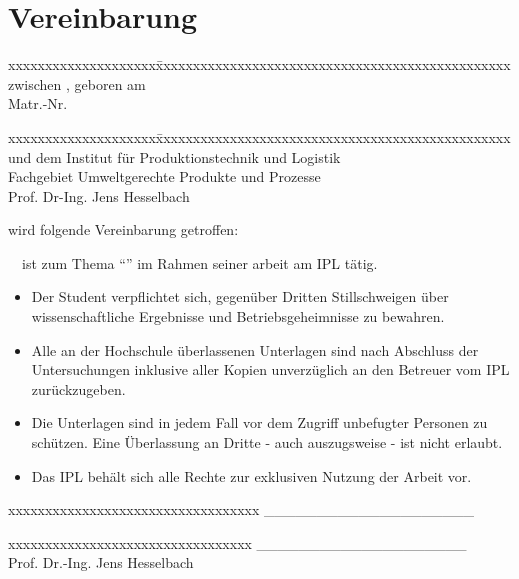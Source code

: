\vspace*{-3cm}
\thispagestyle{empty}
\thispagestyle{plain}								%

\section*{Vereinbarung}
\vskip 20pt
\begin{tabbing}
xxxxxxxxxxxxxxxxxxxx\=xxxxxxxxxxxxxxxxxxxxxxxxxxxxxxxxxxxxxxxxxxxxxxxx\kill
zwischen 			\> \vornamenachname, geboren am \geburtsdatum \\
							\>Matr.-Nr. \matrikelnummer \bigskip
\end{tabbing}
\begin{tabbing}
xxxxxxxxxxxxxxxxxxxx\=xxxxxxxxxxxxxxxxxxxxxxxxxxxxxxxxxxxxxxxxxxxxxxxx\kill
und dem \>Institut für Produktionstechnik und Logistik\\
\>Fachgebiet Umweltgerechte Produkte und Prozesse\\
\>Prof. Dr-Ing. Jens Hesselbach
\end{tabbing}
\vskip 20pt
wird folgende Vereinbarung getroffen: \\
\vskip 20pt


\anrede\ \vornamenachname\ ist zum Thema "`\thesistitle"' im Rahmen seiner \thesistype arbeit am IPL tätig.

\vskip 20pt
\begin{itemize}																	%
\item{Der Student verpflichtet sich, gegenüber Dritten Stillschweigen über wissenschaftliche Ergebnisse und Betriebsgeheimnisse zu bewahren.}
\item{Alle an der Hochschule überlassenen Unterlagen sind nach Abschluss der Untersuchungen inklusive aller Kopien unverzüglich an den Betreuer vom IPL zurückzugeben.}
\item{Die Unterlagen sind in jedem Fall vor dem Zugriff unbefugter Personen zu schützen. Eine Überlassung an Dritte - auch auszugsweise - ist nicht erlaubt.}
\item{Das IPL behält sich alle Rechte zur exklusiven Nutzung der Arbeit vor.}
\end{itemize}
\vskip 70pt

	\begin{minipage}[c]{6cm}
		\begin{tabbing}
			xxxxxxxxxxxxxxxxxxxxxxxxxxxxxxxxxx\kill
			\_\_\_\_\_\_\_\_\_\_\_\_\_\_\_\_\_\_\_\_ \\
			\vornamenachname
		\end{tabbing}
	\end{minipage}
	\hfill
	\begin{minipage}[c]{10cm}
		\begin{tabbing}
			xxxxxxxxxxxxxxxxxxxxxxxxxxxxxxxxx\kill
			\_\_\_\_\_\_\_\_\_\_\_\_\_\_\_\_\_\_\_\_ \\
			Prof. Dr.-Ing. Jens Hesselbach
		\end{tabbing}
	\end{minipage}